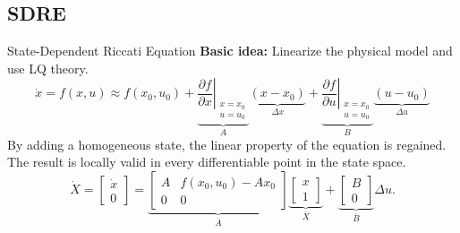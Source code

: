 \subsection{SDRE}
\begin{frame}{State-Dependent Riccati Equation}
    \textbf{Basic idea: } Linearize the physical model and use LQ theory.
    \tiny
    \begin{equation*}
        \dot{x} = f(x,u) \approx f(x_{0},u_{0})
            + \underbrace{\left. \frac{\partial f}{\partial x} \right|_{
                \begin{array}{l}
                    x=x_{0} \\
                    u=u_{0}
                \end{array}
            }}_{A}
                \underbrace{\left( x-x_{0} \right)}_{\Delta x}
            + \underbrace{\left. \frac{\partial f}{\partial u} \right|_{
                \begin{array}{l}
                    x=x_{0} \\
                    u=u_{0}
                \end{array}
            }}_{B}
                \underbrace{\left( u-u_{0} \right)}_{\Delta u}
    \end{equation*}
    \normalsize
    By adding a homogeneous state, the linear property of the equation is regained.
    The result is locally valid in every differentiable point in the state space.
    \tiny
    \begin{equation*}
        \dot{X} = \left[
        \begin{array}{c}
            \dot{x} \\
            0
        \end{array}\right] =
        \underbrace{\left[
        \begin{array}{cc}
            A & f(x_{0},u_{0})-Ax_{0} \\
            0 & 0
        \end{array}\right]}_{\bar{A}}
        \underbrace{\left[
        \begin{array}{c}
            x \\
            1
        \end{array}\right]}_{\bar{X}}
        +
        \underbrace{\left[
        \begin{array}{c}
            B \\
            0
        \end{array}\right]}_{\bar{B}}
        \Delta u.
    \end{equation*}
\end{frame}
